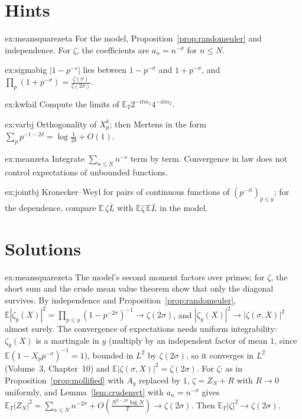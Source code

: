 \section{Hints}

\begin{hint}{ex:meansquarezeta}
For the model, Proposition~\ref{prop:randomeuler} and independence. For $\zeta$, the coefficients are $a_n=n^{-\sigma}$ for $n\le N$.
\end{hint}
\begin{hint}{ex:sigmabig}
$|1-p^{-s}|$ lies between $1-p^{-\sigma}$ and $1+p^{-\sigma}$, and $\prod_p(1+p^{-\sigma})=\frac{\zeta(\sigma)}{\zeta(2\sigma)}$.
\end{hint}
\begin{hint}{ex:kwfail}
Compute the limits of $\mathbb E_T2^{-itm_1}4^{-itm_2}$.
\end{hint}
\begin{hint}{ex:varbj}
Orthogonality of $X_p^k$; then Mertens in the form $\sum_pp^{-1-2\delta}=\log\frac1{2\delta}+O(1)$.
\end{hint}
\begin{hint}{ex:meanzeta}
Integrate $\sum_{n\le N}n^{-s}$ term by term. Convergence in law does not control expectations of unbounded functions.
\end{hint}
\begin{hint}{ex:jointbj}
Kronecker--Weyl for pairs of continuous functions of $(p^{-it})_{p\le y}$; for the dependence, compare $\mathbb E\,\zeta\overline{L}$ with $\mathbb E\zeta\,\mathbb E\overline L$ in the model.
\end{hint}

\section{Solutions}

\begin{solution}{ex:meansquarezeta}
\idea The model's second moment factors over primes; for $\zeta$, the short sum and the crude mean value theorem show that only the diagonal survives.
\writeup By independence and Proposition~\ref{prop:randomeuler}, $\mathbb E|\zeta_y(X)|^2=\prod_{p\le y}(1-p^{-2\sigma})^{-1}\to\zeta(2\sigma)$, and $|\zeta_y(X)|^2\to|\zeta(\sigma,X)|^2$ almost surely. The convergence of expectations needs uniform integrability: $\zeta_y(X)$ is a martingale in $y$ (multiply by an independent factor of mean $1$, since $\mathbb E(1-X_pp^{-\sigma})^{-1}=1$), bounded in $L^2$ by $\zeta(2\sigma)$, so it converges in $L^2$ (Volume~3, Chapter~10) and $\mathbb E|\zeta(\sigma,X)|^2=\zeta(2\sigma)$. For $\zeta$: as in Proposition~\ref{prop:mollified} with $A_y$ replaced by $1$, $\zeta=Z_N+R$ with $R\to0$ uniformly, and Lemma~\ref{lem:crudemvt} with $a_n=n^{-\sigma}$ gives $\mathbb E_T|Z_N|^2=\sum_{n\le N}n^{-2\sigma}+O(\frac{N^{2-2\sigma}\log N}T)\to\zeta(2\sigma)$. Then $\mathbb E_T|\zeta|^2\to\zeta(2\sigma)$.
\end{solution}


